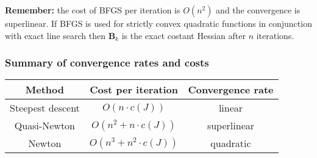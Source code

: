 \textbf{Remember:} the cost of BFGS per iteration is $O(n^2)$ and the convergence is superlinear. If BFGS is used for strictly convex quadratic functions in conjunction with exact line search then $\mathbf{B}_k$ is the exact costant Hessian after $n$ iterations.\\

\subsubsection*{Summary of convergence rates and costs}
\begin{center}
    \begin{tabular}{|c|c|c|}
        \hline
        \textbf{Method} & \textbf{Cost per iteration} & \textbf{Convergence rate}\\
        \hline
        Steepest descent & $O(n\cdot c(J))$ & linear\\
        \hline
        Quasi-Newton & $O(n^2 + n\cdot c(J))$ & superlinear\\
        \hline
        Newton & $O(n^3 + n^2\cdot c(J))$ & quadratic\\
        \hline
    \end{tabular}
\end{center}
 